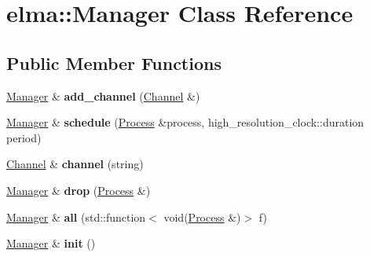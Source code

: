 \hypertarget{classelma_1_1_manager}{}\section{elma\+::Manager Class Reference}
\label{classelma_1_1_manager}
\subsection*{Public Member Functions}
\begin{DoxyCompactItemize}
\item 
\mbox{\label{classelma_1_1_manager_aa75af3cacc2e77ba4781b09353b8c2ad}} 
\mbox{\hyperlink{classelma_1_1_manager}{Manager}} \& {\bfseries add\+\_\+channel} (\mbox{\hyperlink{classelma_1_1_channel}{Channel}} \&)
\item 
\mbox{\label{classelma_1_1_manager_aff7ec0e7409420c8d92a59443066738c}} 
\mbox{\hyperlink{classelma_1_1_manager}{Manager}} \& {\bfseries schedule} (\mbox{\hyperlink{classelma_1_1_process}{Process}} \&process, high\+\_\+resolution\+\_\+clock\+::duration period)
\item 
\mbox{\label{classelma_1_1_manager_ace725510fd2bd626e9011e33d8ea92a2}} 
\mbox{\hyperlink{classelma_1_1_channel}{Channel}} \& {\bfseries channel} (string)
\item 
\mbox{\label{classelma_1_1_manager_a243563706152388a5e19e31b2d080782}} 
\mbox{\hyperlink{classelma_1_1_manager}{Manager}} \& {\bfseries drop} (\mbox{\hyperlink{classelma_1_1_process}{Process}} \&)
\item 
\mbox{\label{classelma_1_1_manager_a235e27c868543b7512f4714394e4b208}} 
\mbox{\hyperlink{classelma_1_1_manager}{Manager}} \& {\bfseries all} (std\+::function$<$ void(\mbox{\hyperlink{classelma_1_1_process}{Process}} \&)$>$ f)
\item 
\mbox{\label{classelma_1_1_manager_a457cd75094c043632a1443758f041090}} 
\mbox{\hyperlink{classelma_1_1_manager}{Manager}} \& {\bfseries init} ()
\item 
\mbox{\label{classelma_1_1_manager_a728729b28a435d000ef059b1d4b9ff16}} 

\end{DoxyCompactItemize}
